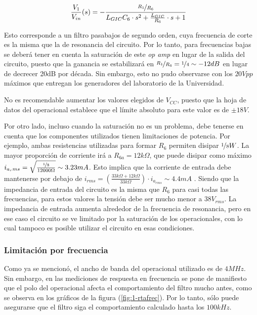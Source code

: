 \documentclass[../../tc_tp3_main.tex]{subfiles}
\begin{document}
\begin{equation}
	\frac{V_1}{V_{in}} (s)=  - \frac{\nicefrac{R_1}{R_6}}{ L_{GIC}C_6 \cdot s^2  + \frac{L_{GIC}}{R_6} \cdot s + 1}
\end{equation}

Esto corresponde a un filtro pasabajos de segundo orden, cuya frecuencia de corte es la misma que la de resonancia del circuito. Por lo tanto, para frecuencias bajas se deber\'a tener en cuenta la saturaci\'on de este \textit{op amp} en lugar de la salida del circuito, puesto que la ganancia se estabilizar\'a en $\nicefrac{R_1}{R_6} = \nicefrac{1}{4}\sim -12dB$ en lugar de decrecer 20dB por d\'ecada. Sin embargo, esto no pudo observarse con los $20V{pp}$ m\'aximos que entregan los generadores del laboratorio de la Universidad. \par

No es recomendable aumentar los valores elegidos de $V_{CC}$, puesto que la hoja de datos del operacional establece que el l\'imite absoluto para este valor es de $\pm 18V$.\par

Por otro lado, incluso cuando la saturaci\'on no es un problema, debe tenerse en cuenta que los componentes utilizados tienen limitaciones de potencia. Por ejemplo, ambas resistencias utilizadas para formar $R_6$ permiten disipar $\nicefrac{1}{8}W$. La mayor proporci\'on de corriente ir\'a a $R_{6a} = 12k\Omega$, que puede disipar como m\'aximo $i_{a_rms} = \sqrt{\frac{\nicefrac{1}{8}}{12000\Omega}} \sim 3.23mA$. Esto implica que la corriente de entrada debe mantenerse por debajo de $i_{rms} = \left(\frac{33k\Omega+12k\Omega}{33k\Omega}\right) \cdot i_{a_{rms}} \sim 4.4mA$ . Siendo que la impedancia de entrada del circuito es la misma que $R_6$ para casi todas las frecuencias, para estos valores la tensi\'on debe ser mucho menor a $38V_{rms}$. La impedancia de entrada aumenta alrededor de la frecuencia de resonancia, pero en ese caso el circuito se ve limitado por la saturaci\'on de los operacionales, con lo cual tampoco es posible utilizar el circuito en esas condiciones. \par



\subsubsection{Limitaci\'on por frecuencia}
Como ya se mencion\'o, el ancho de banda del operacional utilizado es de $4MHz$. Sin embargo, en las mediciones de respuesta en frecuencia se pone de manifiesto que el polo del operacional afecta el comportamiento del filtro mucho antes, como se observa en los gr\'aficos de la figura (\ref{fig:1-rtafrec}). Por lo tanto, s\'olo puede asegurarse que el filtro siga el comportamiento calculado hasta los $100kHz$.
\end{document}
